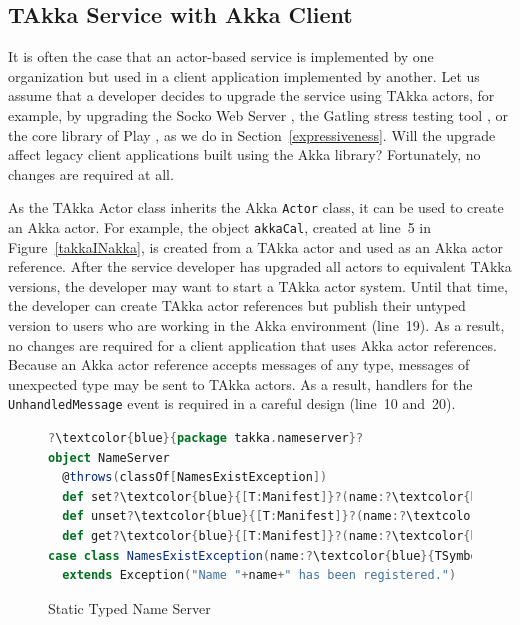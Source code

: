 \subsection{TAkka Service with Akka Client}

It is often the case that an actor-based service is implemented by one 
organization but used in a client application implemented by another.  
Let us assume that a developer decides to upgrade the service 
using TAkka actors, for example, by upgrading the Socko Web Server 
\cite{SOCKO}, the Gatling stress testing tool \cite{Gatling}, or the core 
library of Play \cite{play_doc}, as we do in Section~\ref{expressiveness}.  
Will the upgrade affect legacy client applications
built using the Akka library?  Fortunately, no changes are required at all.

As the TAkka {Actor} class inherits the Akka {\tt Actor} class, it can be used 
to create an Akka actor.  For example, the object {\tt akkaCal}, created at 
line~5 in Figure~\ref{takkaINakka}, is created from a TAkka actor and used as an Akka
actor reference.  After the service developer has upgraded all actors to equivalent 
TAkka versions, the developer may want to start a TAkka actor system.  Until that
time, the developer can create TAkka actor references but publish their untyped
version to users who are working in the Akka environment (line~19).
As a result, no changes are required for a client 
application that uses Akka actor references.  Because an Akka actor reference 
accepts messages of any type, messages of unexpected type may be sent to TAkka actors.  
As a result, handlers for the {\tt UnhandledMessage} event is required in a
careful design (line~10 and~20).

\begin{figure}[t]
\label{static_name_server}
\begin{lstlisting}[language=scala, escapechar=?]
?\textcolor{blue}{package takka.nameserver}?
object NameServer 
  @throws(classOf[NamesExistException])
  def set?\textcolor{blue}{[T:Manifest]}?(name:?\textcolor{blue}{TSymbol[T]}?, value:?\textcolor{blue}{T}?):Boolean
  def unset?\textcolor{blue}{[T:Manifest]}?(name:?\textcolor{blue}{TSymbol[T]}?):Boolean
  def get?\textcolor{blue}{[T:Manifest]}?(name:?\textcolor{blue}{TSymbol[T]}?):Option[?\textcolor{blue}{T}?]
case class NamesExistException(name:?\textcolor{blue}{TSymbol[\_]}?)
  extends Exception("Name "+name+" has been registered.")
\end{lstlisting}
\caption{Static Typed Name Server}
\vspace{-10pt}
\end{figure}

